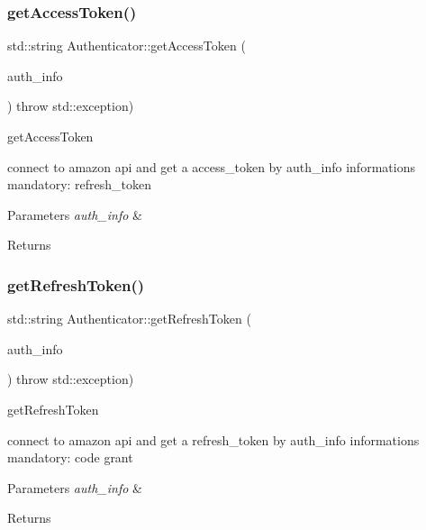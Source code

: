 \subsubsection{\texorpdfstring{get\+Access\+Token()}{getAccessToken()}}
{\footnotesize\ttfamily std\+::string Authenticator\+::get\+Access\+Token (\begin{DoxyParamCaption}\item[{\hyperlink{classAuth_1_1AuthInfo}{Auth\+Info} $\ast$}]{auth\+\_\+info }\end{DoxyParamCaption}) throw  std\+::exception) }



get\+Access\+Token 

connect to amazon api and get a access\+\_\+token by auth\+\_\+info informations mandatory\+: refresh\+\_\+token


\begin{DoxyParams}{Parameters}
{\em auth\+\_\+info} & \\
\hline
\end{DoxyParams}
\begin{DoxyReturn}{Returns}

\end{DoxyReturn}
\mbox{\label{classAuth_1_1Authenticator_a2f826abed3c44795178ed74f4f9fbc0c}} 
\subsubsection{\texorpdfstring{get\+Refresh\+Token()}{getRefreshToken()}}
{\footnotesize\ttfamily std\+::string Authenticator\+::get\+Refresh\+Token (\begin{DoxyParamCaption}\item[{\hyperlink{classAuth_1_1AuthInfo}{Auth\+Info} $\ast$}]{auth\+\_\+info }\end{DoxyParamCaption}) throw  std\+::exception) }



get\+Refresh\+Token 

connect to amazon api and get a refresh\+\_\+token by auth\+\_\+info informations mandatory\+: code grant


\begin{DoxyParams}{Parameters}
{\em auth\+\_\+info} & \\
\hline
\end{DoxyParams}
\begin{DoxyReturn}{Returns}

\end{DoxyReturn}
\mbox{\label{classAuth_1_1Authenticator_accb5d9b70982e7118136b81e0b0e2a4e}} 
